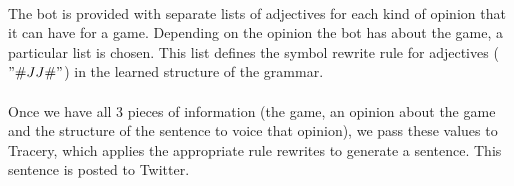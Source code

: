 \paragraph{}
The bot is provided with separate lists of adjectives for each kind of opinion that it can have for a game. Depending on the opinion the bot has about the game, a particular list is chosen. This list defines the symbol rewrite rule for adjectives ($"\#JJ\#"$) in the learned structure of the grammar.
\paragraph{}
Once we have all 3 pieces of information (the game, an opinion about the game and the structure of the sentence to voice that opinion), we pass these values to Tracery, which applies the appropriate rule rewrites to generate a sentence. This sentence is posted to Twitter.